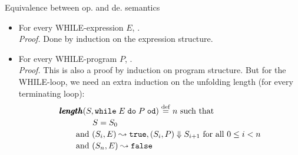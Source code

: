 \documentclass[paper=screen,mode=present,style=zysimple]{powerdot}
\begin{document}
\begin{slide}{Equivalence between op. and de. semantics}
\begin{itemize}
\item For every WHILE-expression $E$, .
\\[0.2em]
{\em Proof.} Done by induction on the expression structure.
\\[0.3em]
\item For every WHILE-program  $P$, .
\\[0.2em]
{\em Proof.} This is also a proof by induction on program structure. But for the WHILE-loop, 
we need an extra induction on the unfolding length (for every terminating loop):
\[
\begin{array}{l}
\pmb{length} (S, \mathtt{while}\; {E} \; \mathtt{do} \; {P} \; \mathtt{od}) \stackrel{\mathrm{def}}{=} n \mbox{ such that} 
\\[0.2em] \qquad \qquad 
S = S_0 
\\[0.2em] \qquad 
\mbox{and } (S_i, E) \leadsto \mathtt{true} ,  (S_{i}, P) \Downarrow S_{i + 1} 
\mbox{ for all } 0 \leq i < n 
\\[0.2em] \qquad 
\mbox{and } (S_n, E) \leadsto \mathtt{false} 
\end{array}
\]
\end{itemize}
\end{slide}
\end{document}
